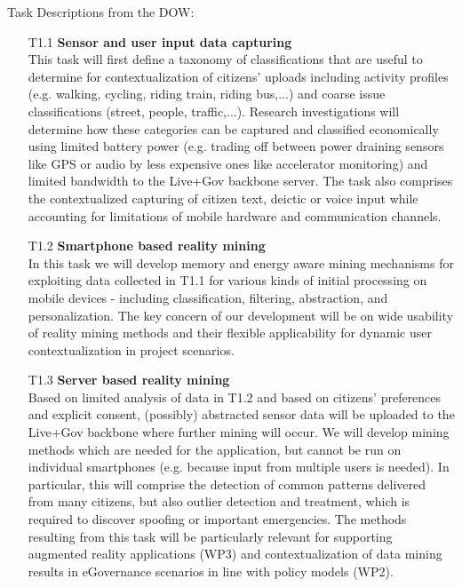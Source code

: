 \documentclass[external]{20120615_deliverable_template_ukob}
\theoremstyle{definition}
\begin{document}
Task Descriptions from the DOW:
\begin{itemize}
\item[T1.1] {\bf Sensor and user input data capturing} \\
  This task will first define a taxonomy of classifications that are useful to
  determine for contextualization of citizens’ uploads including activity
  profiles (e.g. walking, cycling, riding train, riding bus,...) and coarse
  issue classifications (street, people, traffic,...). Research investigations
  will determine how these categories can be captured and classified
  economically using limited battery power (e.g. trading off between power
  draining sensors like GPS or audio by less expensive ones like accelerator
  monitoring) and limited bandwidth to the Live+Gov backbone server. The task
  also comprises the contextualized capturing of citizen text, deictic or voice
  input while accounting for limitations of mobile hardware and communication
  channels.
\item[T1.2] {\bf Smartphone based reality mining} \\
  In this task we will develop memory and energy aware mining mechanisms for
  exploiting data collected in T1.1 for various kinds of initial processing on
  mobile devices - including classification, filtering, abstraction, and
  personalization. The key concern of our development will be on wide usability
  of reality mining methods and their flexible applicability for dynamic user
  contextualization in project scenarios.
\item[T1.3] {\bf Server based reality mining} \\
  Based on limited analysis of data in T1.2 and based on citizens’ preferences
  and explicit consent, (possibly) abstracted sensor data will be uploaded to
  the Live+Gov backbone where further mining will occur. We will develop mining
  methods which are needed for the application, but cannot be run on individual
  smartphones (e.g.  because input from multiple users is needed). In
  particular, this will comprise the detection of common patterns delivered from
  many citizens, but also outlier detection and treatment, which is required to
  discover spoofing or important emergencies. The methods resulting from this
  task will be particularly relevant for supporting augmented reality
  applications (WP3) and contextualization of data mining results in eGovernance
  scenarios in line with policy models (WP2).
\end{itemize}
\end{document}
